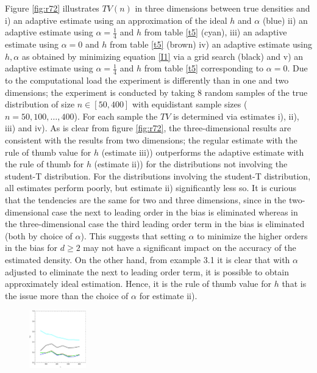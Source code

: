 \documentclass[
twoside,
openright,
titlepage,
numbers=noenddot,
headinclude,%
footinclude=true,
dottedtoc, %
ngerman,
american, %
pagesize=pdftex,
]{book}
\begin{document}
	\begin{example}
		Figure \ref{fig:r72} illustrates $TV(n)$ in three dimensions between true densities and i) an adaptive estimate using an approximation of the ideal $h$ and $\alpha$ (blue) ii) an adaptive estimate using $\alpha=\frac{1}{4}$ and $h$ from table \ref{t5} (cyan), iii) an adaptive estimate using $\alpha=0$ and $h$ from table \ref{t5} (brown) iv) an adaptive estimate using $h,\alpha$ as obtained by minimizing equation \eqref{I1} via a grid search (black) and v) an adaptive estimate using $\alpha=\frac{1}{4}$ and $h$ from table \ref{t5} corresponding to $\alpha=0$. Due to the computational load the experiment is differently than in one and two dimensions; the experiment is conducted by taking $8$ random samples of the true distribution of size $n\in [50,400]$ with equidistant sample sizes ($n=50,100,\dots,400$). For each sample the $TV$ is determined via estimates i), ii), iii) and iv). \newline	
		As is clear from figure \ref{fig:r72}, the three-dimensional results are consistent with the results from two dimensions; the regular estimate with the rule of thumb value for $h$ (estimate iii)) outperforms the adaptive estimate with the rule of thumb for $h$ (estimate ii)) for the distributions not involving the student-T distribution. For the distributions involving the student-T distribution, all estimates perform poorly, but estimate ii) significantly less so.	It is curious that the tendencies are the same for two and three dimensions, since in the two-dimensional case the next to leading order in the bias is eliminated whereas in the three-dimensional case the third leading order term in the bias is eliminated (both by choice of $\alpha$). This suggests that setting $\alpha$ to minimize the higher orders in the bias for $d\geq 2$ may not have a significant impact on the accuracy of the estimated density. On the other hand, from example 3.1 it is clear that with $\alpha$ adjusted to eliminate the next to leading order term, it is possible to obtain approximately ideal estimation. Hence, it is the rule of thumb value for $h$ that is the issue more than the choice of $\alpha$ for estimate ii). 
		\begin{figure}[H]
			\centering
			\captionsetup{width=0.95\textwidth}
			\includegraphics[width=0.22\textwidth]{figures/2+3Dexample/e3n1}

\end{figure}
\end{example}
\end{document}
